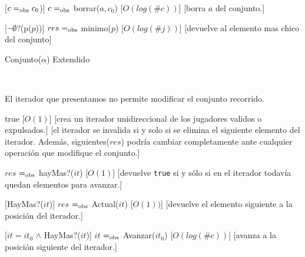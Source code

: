 \begin{Interfaz}
	[$c =_{\mathrm{obs}} c_0$)]
	{$c =_{\mathrm{obs}}$ borrar($a, c_0$)}
	[$O(log(\#c))$]
	[borra $a$ del conjunto.]

	[$\neg\emptyset$?(p($p$))]
	{$res =_{\mathrm{obs}}$ minimo($p$)}
	[$O(log(\#j))$]
	[devuelve al elemento mas chico del conjunto]


	\begin{tad}{Conjunto($\alpha$) Extendido}
	\parskip=0pt


	\tadAxiomas

	~

	\end{tad}



	El iterador que presentamos no permite modificar el conjunto recorrido.


	{true}
	[$O(1)$]
	[crea un iterador unidireccional de los jugadores validos o expulsados.]
	[el iterador se invalida si y solo si se elimina el siguiente elemento del iterador. Además, siguientes($res$) podría cambiar completamente ante cualquier operación que modifique el conjunto.]

	{$res$ $=_{\mathrm{obs}}$ hayMas?($it$)}
	[$O(1)$]
	[devuelve \texttt{true} si y sólo si en el iterador todavía quedan elementos para avanzar.]

	[HayMas?($it$)]
	{$res$ $=_{\mathrm{obs}}$ Actual($it$)}
	[$O(1))$]
	[devuelve el elemento siguiente a la posición del iterador.]

	[$it = it_0$ $\land$ HayMas?($it$)]
	{$it$ $=_{\mathrm{obs}}$ Avanzar($it_0$)}
	[$O(log(\#c))$]
	[avanza a la posición siguiente del iterador.]

\end{Interfaz}


